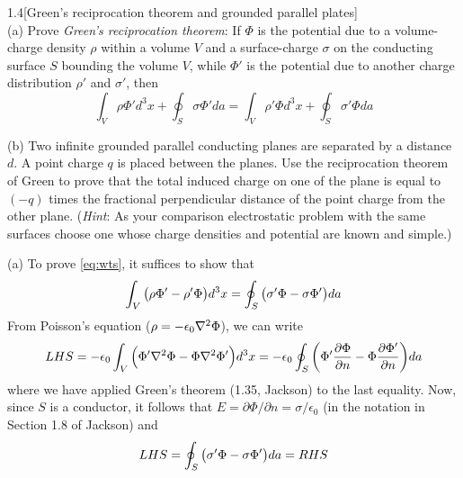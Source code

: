 \documentclass[12pt]{article}
\begin{document}
\begin{problem}{1.4}[Green's reciprocation theorem and grounded
    parallel plates]~\\

(a) Prove \textit{Green's reciprocation theorem}: If $\Phi$ is the potential due
to a volume-charge density $\rho$ within a volume $V$ and a surface-charge
$\sigma$ on the conducting surface $S$ bounding the volume $V$, while $\Phi'$ is
the potential due to another charge distribution $\rho'$ and $\sigma'$, then
\begin{equation}\label{eq:wts}
    \int_V\rho\Phi'd^3x+\oint_S\sigma\Phi' da=\int_V\rho'\Phi
    d^3x+\oint_S\sigma'\Phi da 
\end{equation}


(b) Two infinite grounded parallel conducting planes are separated by a distance
$d$. A point charge $q$ is placed between the planes. Use the reciprocation
theorem of Green to prove that the total induced charge on one of the plane is
equal to $(-q)$ times the fractional perpendicular distance of the point charge
from the other plane. (\textit{Hint}: As your comparison electrostatic problem
with the same surfaces choose one whose charge densities and potential are known
and simple.)

\begin{solution}
    (a) To prove \eqref{eq:wts}, it suffices to show that
    \begin{equation}
        \int_V\qty(\rho\Phi'-\rho'\Phi)d^3x
        =\oint_S\qty(\sigma'\Phi-\sigma\Phi')da
    \end{equation}
    From Poisson's equation ($\rho=-\epsilon_0\laplacian\Phi$), we can write 
    \begin{equation}
        LHS=-\epsilon_0\int_V
        \qty(\Phi'\laplacian\Phi-\Phi\laplacian{\Phi'})d^3x
        =-\epsilon_0\oint_S\qty(
        \Phi'\frac{\partial\Phi}{\partial n}-\Phi\frac{\partial\Phi'}{\partial
        n})da
    \end{equation}
    where we have applied Green's theorem (1.35, Jackson) to the last equality.
    Now, since $S$ is a conductor, it follows that $E=\partial\Phi/\partial
    n=\sigma/\epsilon_0$ (in the notation in Section 1.8 of Jackson) and
    \begin{equation}
        LHS=\oint_S\qty(\sigma'\Phi-\sigma\Phi')da=RHS   
    \end{equation}


\end{solution}
\end{problem}
\end{document}
